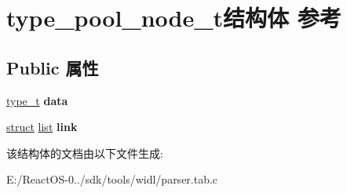 \hypertarget{structtype__pool__node__t}{}\section{type\+\_\+pool\+\_\+node\+\_\+t结构体 参考}
\label{structtype__pool__node__t}
\subsection*{Public 属性}
\begin{DoxyCompactItemize}
\item 
\mbox{\label{structtype__pool__node__t_adc115d557262f2bf0543c9954ec33157}} 
\hyperlink{struct__type__t}{type\+\_\+t} {\bfseries data}
\item 
\mbox{\label{structtype__pool__node__t_a5222f6a6784cb89910c228349c42aab7}} 
\hyperlink{interfacestruct}{struct} \hyperlink{classlist}{list} {\bfseries link}
\end{DoxyCompactItemize}


该结构体的文档由以下文件生成\+:\begin{DoxyCompactItemize}
\item 
E\+:/\+React\+O\+S-\/0../sdk/tools/widl/parser.\+tab.\+c\end{DoxyCompactItemize}
